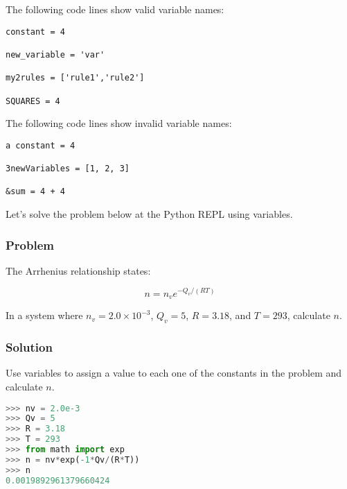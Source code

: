 \documentclass{book}
\begin{document}
    
        The following code lines show valid variable names:
    




    
        \begin{lstlisting}
constant = 4

new_variable = 'var'

my2rules = ['rule1','rule2']

SQUARES = 4
\end{lstlisting}
    




    
        The following code lines show invalid variable names:
    




    
        \begin{lstlisting}
a constant = 4

3newVariables = [1, 2, 3]

&sum = 4 + 4
\end{lstlisting}
    




    
        Let's solve the problem below at the Python REPL using variables.

\hypertarget{problem}{%
\subsubsection{Problem}\label{problem}}

The Arrhenius relationship states:

\[ n = n_{v}e^{-Q_v/(RT)} \]

In a system where \(n_v = 2.0 \times 10^{-3}\), \(Q_v = 5\), \(R=3.18\),
and \(T=293\), calculate \(n\).

\hypertarget{solution}{%
\subsubsection{Solution}\label{solution}}

Use variables to assign a value to each one of the constants in the
problem and calculate \(n\).

\begin{lstlisting}[language=Python]
>>> nv = 2.0e-3
>>> Qv = 5
>>> R = 3.18
>>> T = 293
>>> from math import exp
>>> n = nv*exp(-1*Qv/(R*T))
>>> n
0.0019892961379660424
\end{lstlisting}
    
\end{document}
